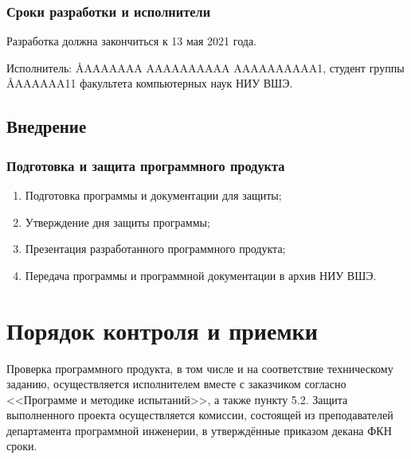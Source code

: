 \documentclass[a4paper,12pt,reqno]{article}
\begin{document}
      \subsubsection*{Сроки разработки и исполнители}
      Разработка должна закончиться к 13 мая 2021 года.

      Исполнитель: \AA{AAAAAAA AAAAAAAAAA AAAAAAAAAA}{1}, студент группы \AA{AAAAAA}{11} факультета компьютерных наук НИУ ВШЭ.
    \subsection{Внедрение}
      \subsubsection*{Подготовка и защита программного продукта}
      \begin{enumerate}
        \item Подготовка программы и документации для защиты;
        \item Утверждение дня защиты программы;
        \item Презентация разработанного программного продукта;
        \item Передача программы и программной документации в архив НИУ ВШЭ.
      \end{enumerate}




  \section{Порядок контроля и приемки}
  Проверка программного продукта, в том числе и на соответствие техническому заданию,
  осуществляется исполнителем вместе с заказчиком согласно <<Программе и методике испытаний>>, а также пункту 5.2.
  Защита выполненного проекта осуществляется комиссии, состоящей из преподавателей департамента программной инженерии,
  в утверждённые приказом декана ФКН сроки.

  \begin{CRTbibliography}
  \end{CRTbibliography}

  \CRTlistRegistration
\end{document}

